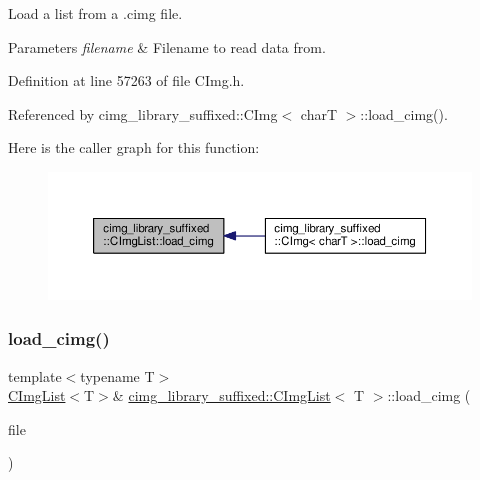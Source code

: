 Load a list from a .cimg file. 


\begin{DoxyParams}{Parameters}
{\em filename} & Filename to read data from. \\
\hline
\end{DoxyParams}


Definition at line 57263 of file C\+Img.\+h.



Referenced by cimg\+\_\+library\+\_\+suffixed\+::\+C\+Img$<$ char\+T $>$\+::load\+\_\+cimg().

Here is the caller graph for this function\+:
\nopagebreak
\begin{figure}[H]
\begin{center}
\leavevmode
\includegraphics[width=350pt]{d5/d7e/structcimg__library__suffixed_1_1CImgList_a71365977297b4b063ca86026467657a4_icgraph}
\end{center}
\end{figure}
\mbox{\label{structcimg__library__suffixed_1_1CImgList_a7f156e0813762a200a9997e014859793}} 
\subsubsection{\texorpdfstring{load\+\_\+cimg()}{load\_cimg()}\hspace{0.1cm}{\footnotesize\ttfamily [2/3]}}
{\footnotesize\ttfamily template$<$typename T$>$ \\
\hyperlink{structcimg__library__suffixed_1_1CImgList}{C\+Img\+List}$<$T$>$\& \hyperlink{structcimg__library__suffixed_1_1CImgList}{cimg\+\_\+library\+\_\+suffixed\+::\+C\+Img\+List}$<$ T $>$\+::load\+\_\+cimg (\begin{DoxyParamCaption}\item[{std\+::\+F\+I\+LE $\ast$const}]{file }\end{DoxyParamCaption})\hspace{0.3cm}{\ttfamily [inline]}}



